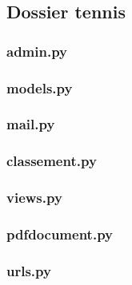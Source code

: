 \subsection{Dossier tennis}

\subsubsection{admin.py}

\subsubsection{models.py}

\subsubsection{mail.py}

\subsubsection{classement.py} 

\subsubsection{views.py}

\subsubsection{pdfdocument.py}

\subsubsection{urls.py}



